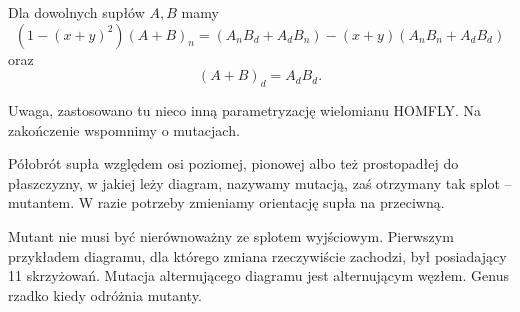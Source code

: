 \begin{proposition}
	Dla dowolnych supłów $A, B$ mamy
	\[
	(1 - (x+y)^2)(A+B)_n = (A_nB_d + A_dB_n) - (x+y)(A_nB_n+  A_dB_d)
	\]
	oraz
	\[
		(A+B)_d = A_dB_d.
	\]
\end{proposition}

Uwaga, zastosowano tu nieco inną parametryzację wielomianu HOMFLY.
Na zakończenie wspomnimy o mutacjach.

\begin{definition}[mutacja]
\label{def:mutant}
	Półobrót supła względem osi poziomej, pionowej albo też prostopadłej do płaszczyzny, w jakiej leży diagram, nazywamy mutacją, zaś otrzymany tak splot -- mutantem.
	W razie potrzeby zmieniamy orientację supła na przeciwną.
\end{definition}

Mutant nie musi być nierównoważny ze splotem wyjściowym.
Pierwszym przykładem diagramu, dla którego zmiana rzeczywiście zachodzi, był posiadający 11 skrzyżowań.
Mutacja alternującego diagramu jest alternującym węzłem.
Genus rzadko kiedy odróżnia mutanty.




